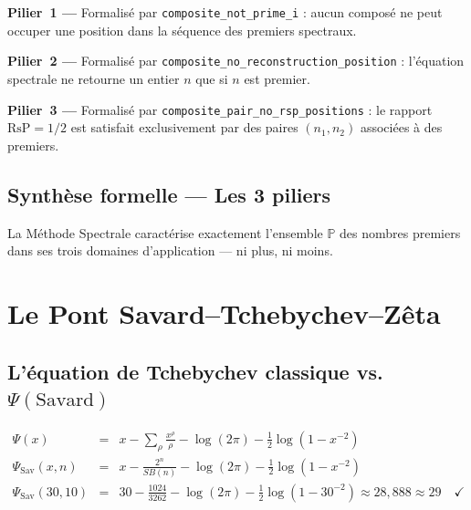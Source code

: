 \documentclass[]{pasj02}
\begin{document}
\textbf{Pilier~1 ---} Formalisé par \texttt{composite\_not\_prime\_i} :
aucun composé ne peut occuper une position dans la séquence des premiers
spectraux.

\textbf{Pilier~2 ---} Formalisé par
\texttt{composite\_no\_reconstruction\_position} : l'équation spectrale ne
retourne un entier $n$ que si $n$ est premier.

\textbf{Pilier~3 ---} Formalisé par
\texttt{composite\_pair\_no\_rsp\_positions} : le rapport $\mathrm{RsP} =
1/2$ est satisfait exclusivement par des paires $(n_1, n_2)$ associées à
des premiers.

\subsection{Synthèse formelle --- Les 3 piliers}
\label{ssec:synthese_piliers}

\begin{theorem}
  La Méthode Spectrale caractérise exactement l'ensemble $\mathbb{P}$ des
  nombres premiers dans ses trois domaines d'application --- ni plus, ni
  moins.
\end{theorem}

\section{Le Pont Savard--Tchebychev--Zêta}
\label{sec:pont}

\subsection{L'équation de Tchebychev classique vs.\
$\Psi(\mathrm{Savard})$}
\label{ssec:tchebychev}
\label{hol:pont_tchebychev}

\begin{eqnarray}
  \Psi(x) &=& x - \sum_{\rho}\frac{x^{\rho}}{\rho}
              - \log(2\pi) - \tfrac{1}{2}\log(1-x^{-2}) \\
  \Psi_{\mathrm{Sav}}(x,n) &=& x - \frac{2^n}{SB(n)}
              - \log(2\pi) - \tfrac{1}{2}\log(1-x^{-2}) \\
  \Psi_{\mathrm{Sav}}(30,10) &=& 30 - \frac{1024}{3262}
              - \log(2\pi) - \tfrac{1}{2}\log(1-30^{-2})
              \approx 28{,}888 \approx 29 \quad\checkmark
\end{eqnarray}
\end{document}
